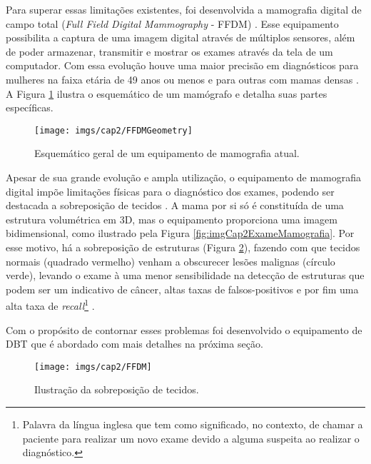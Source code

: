 Para superar essas limitações existentes, foi desenvolvida a mamografia digital de campo total (\textit{Full Field Digital Mammography} - \acs{FFDM})  \cite{nishikawa1987scanned,yaffe1988development}. Esse equipamento possibilita a captura de uma imagem digital através de múltiplos sensores, além de poder armazenar, transmitir e mostrar os exames através da tela de um computador. Com essa evolução houve uma maior precisão em diagnósticos para mulheres na faixa etária de 49 anos ou menos e para outras com mamas densas \cite{vedantham2015digital}. A Figura \ref{fig:imgCap2EsquematicoMamografia} ilustra o esquemático de um mamógrafo e detalha suas partes específicas. 

\begin{figure}[htb]
	\caption{Esquemático geral de um equipamento de mamografia atual.}
	\begin{center}
		\texttt{[image: imgs/cap2/FFDMGeometry]}
	\end{center}
	\label{fig:imgCap2EsquematicoMamografia}
\end{figure}

Apesar de sua grande evolução e ampla utilização, o equipamento de mamografia digital impõe limitações físicas para o diagnóstico dos exames, podendo ser destacada a sobreposição de tecidos \cite{vedantham2015digital}. A mama por si só é constituída de uma estrutura volumétrica em \acs{3D}, mas o equipamento proporciona uma imagem bidimensional, como ilustrado pela Figura \ref{fig:imgCap2ExameMamografia}. Por esse motivo, há a sobreposição de estruturas (Figura \ref{fig:imgCap2MamografiaSobreposicao}), fazendo com que tecidos normais (quadrado vermelho) venham a obscurecer lesões malignas (círculo verde), levando o exame à uma menor sensibilidade na detecção de estruturas que podem ser um indicativo de câncer, altas taxas de falsos-positivos e por fim uma alta taxa de \textit{recall}\footnote{Palavra da língua inglesa que tem como significado, no contexto, de chamar a paciente para realizar um novo exame devido a alguma suspeita ao realizar o diagnóstico.} \cite{roth2014digital}. 

Com o propósito de contornar esses problemas foi desenvolvido o equipamento de \acs{DBT} que é abordado com mais detalhes na próxima seção. 

\begin{figure}[htb]
	\caption{Ilustração da sobreposição de tecidos.}
	\begin{center}
		\texttt{[image: imgs/cap2/FFDM]}
	\end{center}
	\label{fig:imgCap2MamografiaSobreposicao}
\end{figure}    

